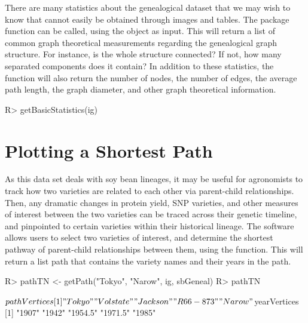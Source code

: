 \documentclass[article,shortnames]{jss}
\begin{document}
There are many statistics about the  genealogical dataset that we may wish to know that cannot easily be obtained through images and tables. The package function  can be called, using the  object as input. This will return a list of common graph theoretical measurements regarding the genealogical graph structure. For instance, is the whole structure connected? If not, how many separated components does it contain? In addition to these statistics, the  function will also return the number of nodes, the number of edges, the average path length, the graph diameter, and other graph theoretical information.

\begin{CodeChunk}
\begin{CodeInput}
R> getBasicStatistics(ig)
\end{CodeInput}
\end{CodeChunk}

\section{Plotting a Shortest Path}

As this data set deals with soy bean lineages, it may be useful for agronomists to track how two varieties are related to each other via parent-child relationships. Then, any dramatic changes in protein yield, SNP varieties, and other measures of interest between the two varieties can be traced across their genetic timeline, and pinpointed to certain varieties within their historical lineage. The  software allows users to select two varieties of interest, and determine the shortest pathway of parent-child relationships between them, using the  function. This will return a list path that contains the variety names and their years in the path.

\begin{CodeChunk}
\begin{CodeInput}
R> pathTN <- getPath("Tokyo", "Narow", ig, sbGeneal)
R> pathTN
\end{CodeInput}
\begin{CodeOutput}
$pathVertices
[1] "Tokyo"    "Volstate" "Jackson"  "R66-873"  "Narow"   

$yearVertices
[1] "1907"   "1942"   "1954.5" "1971.5" "1985" 
\end{CodeOutput}
\end{CodeChunk}
\end{document}
